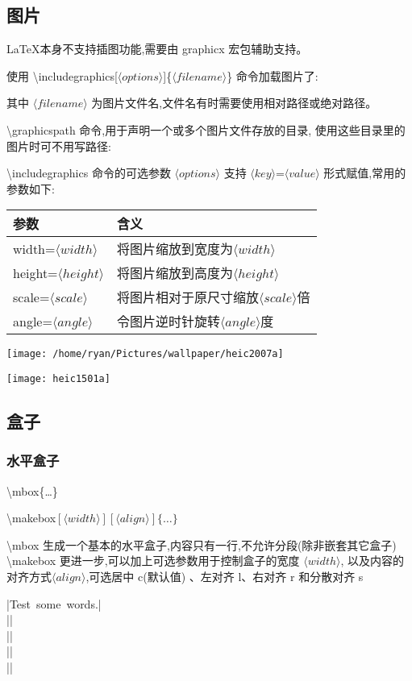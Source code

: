 \documentclass[a4paper]{ctexart}
\begin{document}
    \subsection{图片}
    \LaTeX 本身不支持插图功能,需要由 graphicx 宏包辅助支持。\par
    使用 \textbackslash includegraphics[$\langle options\rangle$]\{$\langle filename\rangle$\} 命令加载图片了:\par
    其中 $\langle filename\rangle$ 为图片文件名,文件名有时需要使用相对路径或绝对路径。\par
    \textbackslash graphicspath 命令,用于声明一个或多个图片文件存放的目录,%
    使用这些目录里的图片时可不用写路径:\par
    \textbackslash includegraphics 命令的可选参数 $\langle options\rangle$ 支持 %
    $\langle key\rangle$=$\langle value\rangle$ 形式赋值,常用的参数如下:\par
    \begin{tabular}{ll}
        \hline
        参数                                 & 含义 \\
        \hline
        width=$\langle width\rangle$        & 将图片缩放到宽度为$\langle width\rangle$ \\
        height=$\langle height\rangle$      & 将图片缩放到高度为$\langle height\rangle$ \\
        scale=$\langle scale\rangle$        & 将图片相对于原尺寸缩放$\langle scale\rangle$倍 \\
        angle=$\langle angle\rangle$        & 令图片逆时针旋转$\langle angle\rangle$度 \\
        \hline
    \end{tabular}
    \texttt{[image: /home/ryan/Pictures/wallpaper/heic2007a]}
    \graphicspath{{/home/ryan/Pictures/wallpaper/}}
    \texttt{[image: heic1501a]}
    \subsection{盒子}
    \subsubsection{水平盒子}
    \textbackslash mbox\{\ldots \}\par
    \textbackslash makebox$[\langle width\rangle][\langle align\rangle]\{\ldots \}$\par
    \textbackslash mbox 生成一个基本的水平盒子,内容只有一行,不允许分段(除非嵌套其它盒子)
    \textbackslash makebox 更进一步,可以加上可选参数用于控制盒子的宽度 $\langle width\rangle$,%
    以及内容的对齐方式$\langle align\rangle$,可选居中 c(默认值) 、左对齐 l、右对齐 r 和分散对齐 s\par
    |\mbox{Test some words.}|\\
    ||\\
    ||\\
    ||\\
    ||\par
\end{document}
